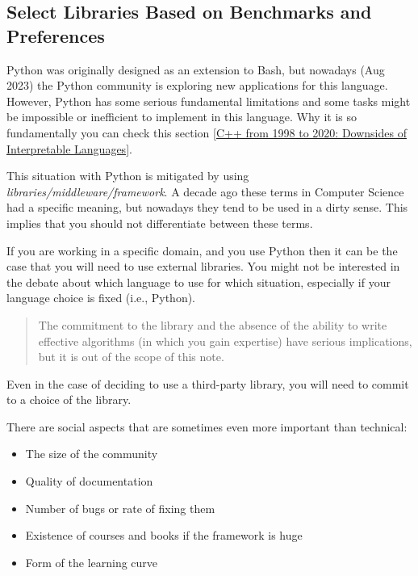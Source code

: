 \documentclass[
]{article}
\begin{document}
\hypertarget{select-libraries-based-on-benchmarks-and-preferences}{%
\subsection{Select Libraries Based on Benchmarks and
Preferences}\label{select-libraries-based-on-benchmarks-and-preferences}}

Python was originally designed as an extension to Bash, but nowadays
(Aug 2023) the Python community is exploring new applications for this
language. However, Python has some serious fundamental limitations and
some tasks might be impossible or inefficient to implement in this
language. Why it is so fundamentally you can check this section
{[}\href{https://github.com/burlachenkok/CPP_from_1998_to_2020/blob/main/Cpp-Technical-Note.md\#downsides-of-interpretable-languages}{C++
from 1998 to 2020: Downsides of Interpretable Languages}{]}.

This situation with Python is mitigated by using
\emph{libraries/middleware/framework}. A decade ago these terms in
Computer Science had a specific meaning, but nowadays they tend to be
used in a dirty sense. This implies that you should not differentiate
between these terms.

If you are working in a specific domain, and you use Python then it can
be the case that you will need to use external libraries. You might not
be interested in the debate about which language to use for which
situation, especially if your language choice is fixed (i.e., Python).

\begin{quote}
The commitment to the library and the absence of the ability to write
effective algorithms (in which you gain expertise) have serious
implications, but it is out of the scope of this note.
\end{quote}

Even in the case of deciding to use a third-party library, you will need
to commit to a choice of the library.

There are social aspects that are sometimes even more important than
technical:

\begin{itemize}
\item
  The size of the community
\item
  Quality of documentation
\item
  Number of bugs or rate of fixing them
\item
  Existence of courses and books if the framework is huge
\item
  Form of the learning curve
\end{itemize}
\end{document}

